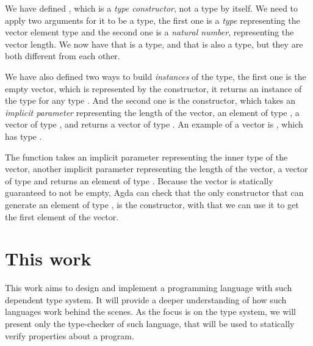 We have defined , which is a \emph{type constructor}, not a type by itself. We need to apply two arguments for it to be a type, the first one is a \emph{type} representing the vector element type and the second one is a \emph{natural number}, representing the vector length. We now have that  is a type, and that  is also a type, but they are both different from each other.

We have also defined two ways to build \emph{instances} of the  type, the first one is the empty vector, which is represented by the \code{[]} constructor, it returns an instance of the type  for any type . And the second one is the \code{_::_} constructor, which takes an \emph{implicit parameter}  representing the length of the vector, an element of type , a vector of type , and returns a vector of type . An example of a vector is , which has type .

The  function takes an implicit parameter  representing the inner type of the vector, another implicit parameter  representing the length of the vector, a vector of type  and returns an element of type . Because the vector is statically guaranteed to not be empty, Agda can check that the only constructor that can generate an element of type , is the \code{_::_} constructor, with that we can use it to get the first element of the vector.




\section{This work}


This work aims to design and implement a programming language with such dependent type system. It will provide a deeper understanding of how such languages work behind the scenes.
As the focus is on the type system, we will present only the type-checker of such language, that will be used to statically verify properties about a program.
